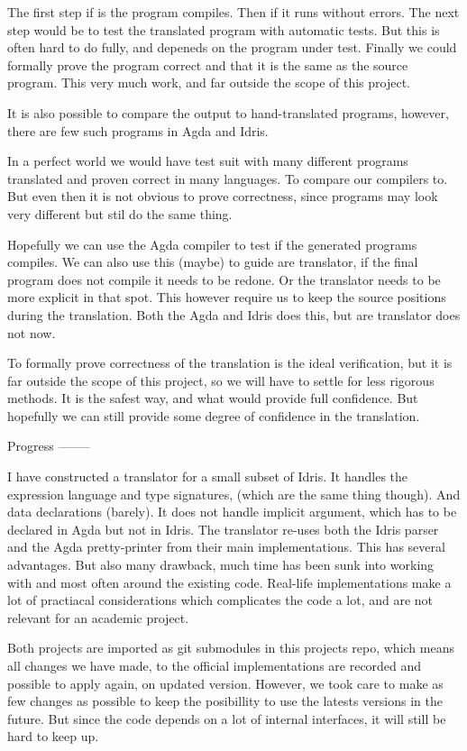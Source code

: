 \documentclass[parskip=half]{scrartcl}
\begin{document}
The first step if is the program compiles.
Then if it runs without errors.
The next step would be to test the translated program with automatic tests.
But this is often hard to do fully, and depeneds on the program under test.
Finally we could formally prove the program correct and that it is the same
as the source program. This very much work, and far outside the scope of this
project.

It is also possible to compare the output to hand-translated programs, however,
there are few such programs in Agda and Idris.

In a perfect world we would have test suit with many different programs
translated and proven correct in many languages. To compare our compilers to.
But even then it is not obvious to prove correctness, since programs may look
very different but stil do the same thing.

Hopefully we can use the Agda compiler to test if the generated programs
compiles. We can also use this (maybe) to guide are translator, if the final
program does not compile it needs to be redone. Or the translator needs to be
more explicit in that spot. This however require us to keep the source
positions during the translation. Both the Agda and Idris does this, but are
translator does not now.

To formally prove correctness of the translation is the ideal verification, but
it is far outside the scope of this project, so we will have to settle for less
rigorous methods. It is the safest way, and what would provide full confidence.
But hopefully we can still provide some degree of confidence in the
translation.


Progress
--------

I have constructed a translator for a small subset of Idris. It handles the
expression language and type signatures, (which are the same thing though). And
data declarations (barely). It does not handle implicit argument, which has to
be declared in Agda but not in Idris. The translator re-uses both the Idris
parser and the Agda pretty-printer from their main implementations. This has
several advantages. But also many drawback, much time has been sunk into
working with and most often around the existing code. Real-life
implementations make a lot of practiacal considerations which complicates the
code a lot, and are not relevant for an academic project.

Both projects are imported as git submodules in this projects repo, which means
all changes we have made, to the official implementations are recorded and
possible to apply again, on updated version. However, we took care to make as
few changes as possible to keep the posibillity to use the latests versions in
the future. But since the code depends on a lot of internal interfaces, it will
still be hard to keep up.
\end{document}
